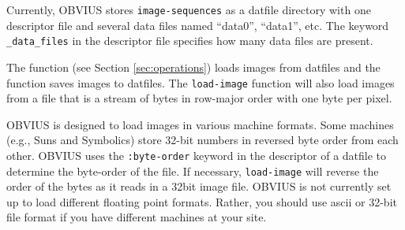 Currently, OBVIUS stores {\tt image-sequences} as a datfile directory
with one descriptor file and several data files named ``data0'',
``data1'', etc.  The keyword {\tt \_data\_files} in the descriptor
file specifies how many data files are present.

The function  (see Section \ref{sec:operations}) loads
images from datfiles and the function  saves images to
datfiles.  The {\tt load-image} function will also load images from a
file that is a stream of bytes in row-major order with one byte per
pixel.

OBVIUS is designed to load images in various machine formats.  Some
machines (e.g., Suns and Symbolics) store 32-bit numbers in reversed
byte order from each other.  OBVIUS uses the {\tt :byte-order}
keyword in the descriptor of a datfile to determine the byte-order of
the file.  If necessary, {\tt load-image} will reverse the order of
the bytes as it reads in a 32bit image file.  OBVIUS is not currently
set up to load different floating point formats.  Rather, you should
use ascii or 32-bit file format if you have different machines at your
site.

